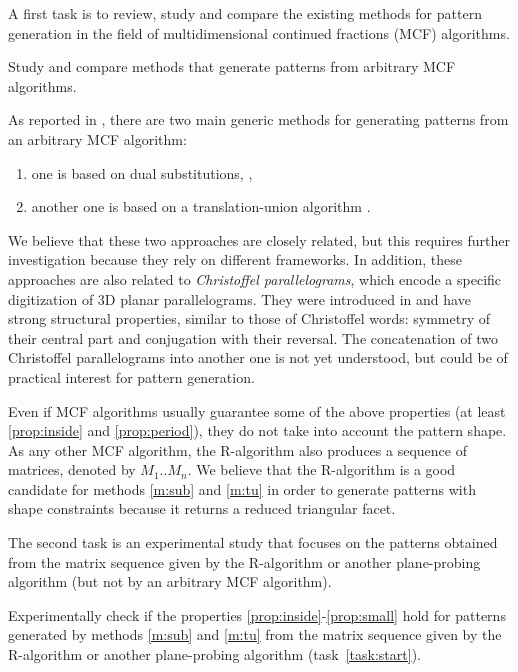 A first task is to review, study and compare the existing methods for pattern generation
in the field of multidimensional continued fractions (MCF) algorithms. 
\begin{Task}
  \label{task:genmeth}
  Study and compare methods that generate patterns from arbitrary MCF algorithms. 
\end{Task}

As reported in , there are two main generic methods for generating patterns
from an arbitrary MCF algorithm:
\begin{enumerate}[label=(M\arabic*)]
\item one is based on dual substitutions, \eg \cite{Fernique2009}, \label{m:sub}
\item another one is based on a translation-union algorithm \cite{Jamet2016}. \label{m:tu}
\end{enumerate}
We believe that these two approaches are closely related, but this requires
further investigation because they rely on different frameworks.
In addition, these approaches are also related to \emph{Christoffel parallelograms},
which encode a specific digitization of 3D planar parallelograms. They were introduced in
\cite{Labbe2015} and have strong structural properties, similar to those of Christoffel words:
symmetry of their central part and conjugation with their reversal.
The concatenation of two Christoffel parallelograms into another one
is not yet understood, but could be of practical interest for pattern generation. 

Even if MCF algorithms usually guarantee some of the above properties
(at least \ref{prop:inside} and \ref{prop:period}), they do not take
into account the pattern shape. As any other MCF algorithm, the R-algorithm
also produces a sequence of matrices, denoted by $M_1..M_n$. We believe that the
R-algorithm is a good candidate for methods \ref{m:sub} and \ref{m:tu} in order
to generate patterns with shape constraints because it returns a reduced triangular facet.

The second task is an experimental study that focuses on the patterns obtained from
the matrix sequence given by the R-algorithm or another plane-probing algorithm (but
not by an arbitrary MCF algorithm).

\begin{Task}
  \label{task:genexp}
  Experimentally check if the properties \ref{prop:inside}-\ref{prop:small}
  hold for patterns generated by methods \ref{m:sub} and \ref{m:tu}
  from the matrix sequence given by the R-algorithm or another plane-probing algorithm
  (task~\ref{task:start}).   
\end{Task}


